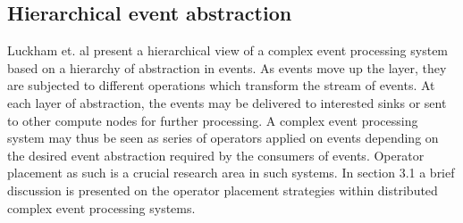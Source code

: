 \subsection{Hierarchical event abstraction}
Luckham et. al \cite{luckham1998complex} present a hierarchical view of a complex event processing system based on a hierarchy of abstraction in events. As events move up the layer, they are subjected to different operations which transform the stream of events. At each layer of abstraction, the events may be delivered to interested sinks or sent to other compute nodes for further processing. A complex event processing system may thus be seen as series of operators applied on events depending on the desired event abstraction required by the consumers of events. Operator placement as such is a crucial research area in such systems. In section 3.1 a brief discussion is presented on the operator placement strategies within distributed complex event processing systems. 

